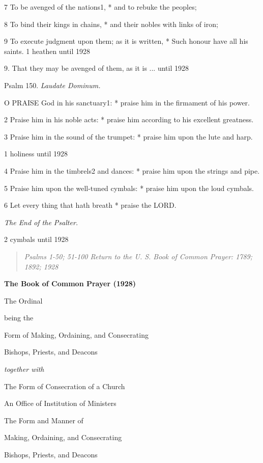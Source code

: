 7 To be avenged of the nations1, * and to
rebuke the peoples;

8 To bind their kings in chains, * and their nobles with
links of iron;

9 To execute judgment upon them; as it is written, *
Such honour have all his saints. 1
heathen until
1928

9. That they may be avenged
of them, as it is ... until
1928

Psalm 150. \emph{Laudate Dominum.}

O
PRAISE God in his sanctuary1: * praise him in the firmament
of his power.

2 Praise him in his noble acts: * praise him according
to his excellent greatness.

3 Praise him in the sound of the trumpet: * praise
him upon the lute and harp.

1 holiness
until
1928

4 Praise him in the timbrels2 and dances: * praise him upon the
strings and pipe.

5 Praise him upon the well-tuned cymbals: * praise him
upon the loud cymbals.

6 Let every thing that hath breath * praise the LORD.

\emph{The
End of the Psalter.}

2
cymbals until
1928

\begin{quote}

\emph{Psalms 1-50;
51-100 Return to the U. S. Book of Common Prayer: 1789;
1892; 1928}

\end{quote}


\textbf{The Book of Common Prayer (1928)}

The Ordinal

being the

Form of Making, Ordaining, and Consecrating

Bishops, Priests, and Deacons

\emph{together with}

The Form of Consecration of a Church

An Office of Institution of Ministers

The Form and Manner of

Making, Ordaining, and Consecrating

Bishops, Priests, and Deacons

